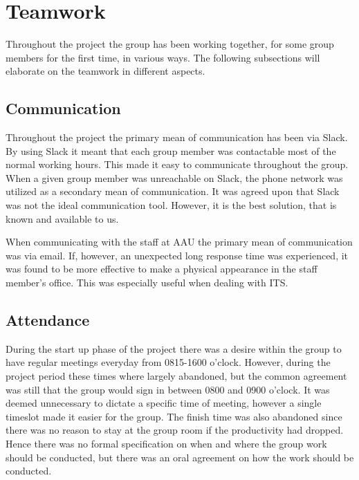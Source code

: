 \section{Teamwork}
Throughout the project the group has been working together, for some group members for the first time, in various ways.
The following subsections will elaborate on the teamwork in different aspects.

\subsection{Communication}
Throughout the project the primary mean of communication has been via Slack.
By using Slack it meant that each group member was contactable most of the normal working hours.
This made it easy to communicate throughout the group.
When a given group member was unreachable on Slack, the phone network was utilized as a secondary mean of communication.
It was agreed upon that Slack was not the ideal communication tool.
However, it is the best solution, that is known and available to us.

When communicating with the staff at AAU the primary mean of communication was via email.
If, however, an unexpected long response time was experienced, it was found to be more effective to make a physical appearance in the staff member's office.
This was especially useful when dealing with ITS.

\subsection{Attendance}
During the start up phase of the project there was a desire within the group to have regular meetings everyday from 0815-1600 o'clock.
However, during the project period these times where largely abandoned, but the common agreement was still that the group would sign in between 0800 and 0900 o'clock.
It was deemed unnecessary to dictate a specific time of meeting, however a single timeslot made it easier for the group.
The finish time was also abandoned since there was no reason to stay at the group room if the productivity had dropped.
Hence there was no formal specification on when and where the group work should be conducted, but there was an oral agreement on how the work should be conducted.
